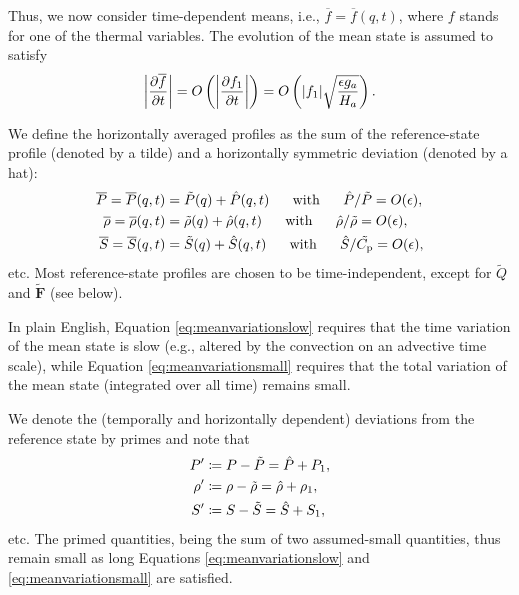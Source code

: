 \documentclass[12pt]{article}
\newcommand{\vecf}{\bm{F}}
\begin{document}
Thus, we now consider time-dependent means, i.e., $\overline{f}=\overline{f}(q,t)$, where $f$ stands for one of the thermal variables. The evolution of the mean state is assumed to satisfy
\begin{align}\label{eq:meanvariationslow}
	\left|\frac{\partial\overline{f}}{\partial t}\right| = O\left(\left|\frac{\partial f_1}{\partial t}\right|\right) = O\left(|f_1|\sqrt{\frac{\epsilon g_a}{H_a}}\right).
\end{align}

We define the horizontally averaged profiles as the sum of the reference-state profile (denoted by a tilde) and a horizontally symmetric deviation (denoted by a hat):
\begin{subequations}\label{eq:meanvariationsmall}
\begin{align}
\overline{P}=	\overline{P}(q,t) &= \tilde{P}(q) + \hat{P}(q,t)\ \ \ \ \ \text{with}\ \ \ \ \  \hat{P}/\tilde{P} = O(\epsilon),\\
\overline{\rho}=	\overline{\rho}(q,t)  &= \tilde{\rho}(q)  + \hat{\rho}(q,t)\ \ \ \ \ \text{with}\ \ \ \ \  \hat{\rho}/\tilde{\rho} = O(\epsilon),\\
	\overline{S} = \overline{S} (q,t) &=  \tilde{S}(q)  + \hat{S}(q,t)\ \ \ \ \ \text{with}\ \ \ \ \  \hat{S}/\tilde{C_{\rm{p}}} =O(\epsilon),
\end{align}
\end{subequations}
etc. Most reference-state profiles are chosen to be time-independent, except for $\tilde{Q}$ and $\tilde{\vecf}$ (see below). 

In plain English, Equation \eqref{eq:meanvariationslow} requires that the time variation of the mean state is slow (e.g., altered by the convection on an advective time scale), while Equation \eqref{eq:meanvariationsmall} requires that the total variation of the mean state (integrated over all time) remains small. 

We denote the (temporally and horizontally dependent) deviations from the reference state by primes and note that 
\begin{subequations}\label{eq:defprime}
\begin{align}
	P^\prime & \coloneqq P - \tilde{P} =\hat{P} +  P_1,\\
	\rho^\prime & \coloneqq \rho - \tilde{\rho} = \hat{\rho} + \rho_1,\\
	S^\prime & \coloneqq S -  \tilde{S} =  \hat{S} + S_1,
\end{align}
\end{subequations}
etc. The primed quantities, being the sum of two assumed-small quantities, thus remain small as long Equations \eqref{eq:meanvariationslow} and \eqref{eq:meanvariationsmall} are satisfied. 
\end{document}
